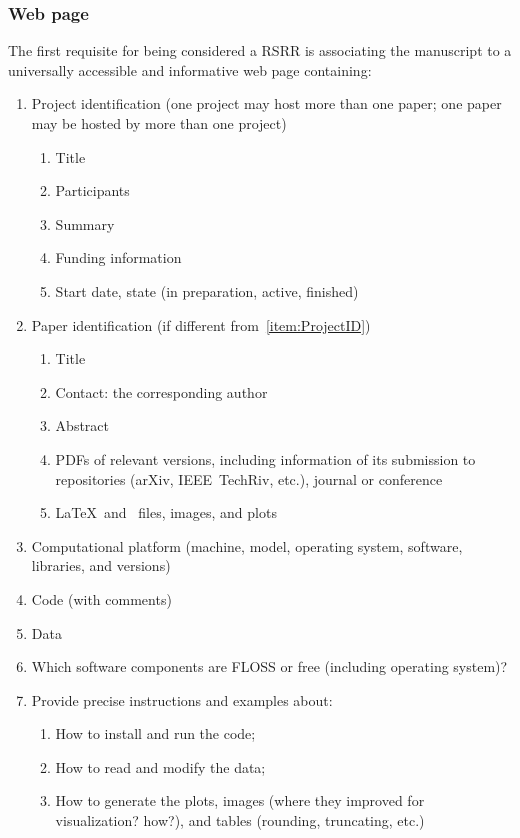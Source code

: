 \documentclass[journal,twoside]{IEEEtran}
\begin{document}
\subsubsection{Web page}\label{Sec:WebPage}
The first requisite for being considered a RSRR is associating the manuscript to a universally accessible and informative web page containing:
\begin{enumerate}
	\item\label{item:ProjectID} Project identification (one project may host more than one paper; one paper may be hosted by more than one project)
	\begin{enumerate}
		\item Title
		\item Participants
		\item Summary
		\item Funding information
		\item Start date, state (in preparation, active, finished)
	\end{enumerate}
	\item Paper identification (if different from~\ref{item:ProjectID})
	\begin{enumerate}
		\item Title
		\item Contact: the corresponding author
		\item Abstract
		\item PDFs of relevant versions, including information of its submission to repositories (arXiv, IEEE~TechRiv, 			etc.), journal or conference
		\item\label{item:SourceDocumentFiles} \LaTeX\ and \BibTeX\ files, images, and plots
	\end{enumerate}
	\item\label{item:Platform} Computational platform (machine, model, operating system, software, libraries, and versions)
	\item Code (with comments)
	\item Data
	\item Which software components are FLOSS or free (including operating system)?
	\item Provide precise instructions and examples about:
	\begin{enumerate}
		\item How to install and run the code;
		\item How to read and modify the data;
		\item How to generate the plots, images (where they improved for visualization? how?), and tables (rounding, truncating, etc.)
	\end{enumerate}
\end{enumerate}
\end{document}
